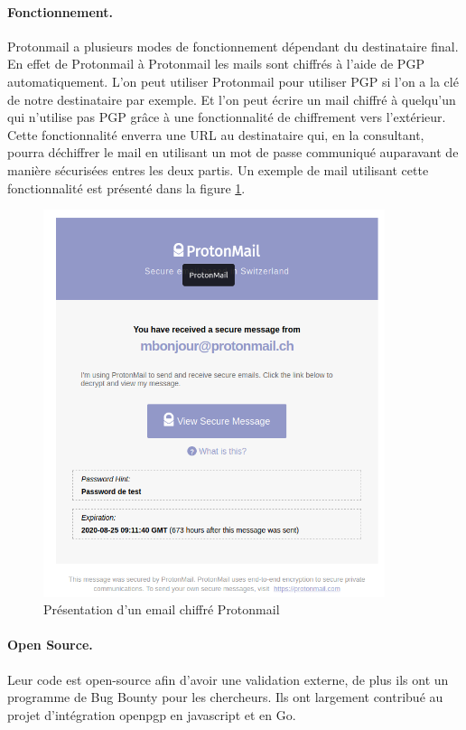 \paragraph*{Fonctionnement.}
Protonmail a plusieurs modes de fonctionnement dépendant du destinataire final. En effet de Protonmail à Protonmail les mails sont chiffrés à l'aide de PGP automatiquement. L'on peut utiliser Protonmail pour utiliser PGP si l'on a la clé de notre destinataire par exemple. Et l'on peut écrire un mail chiffré à quelqu'un qui n'utilise pas PGP grâce à une fonctionnalité de chiffrement vers l'extérieur.
Cette fonctionnalité enverra une URL au destinataire qui, en la consultant, pourra déchiffrer le mail en utilisant un mot de passe communiqué auparavant de manière sécurisées entres les deux partis. Un exemple de mail utilisant cette fonctionnalité est présenté dans la figure \ref{fig:ProtonmailPres}.
\begin{figure}[h!]
	\includegraphics[width=10cm]{images/protonmailPresentation.png}
	\centering
	\caption{Présentation d'un email chiffré Protonmail}
	\label{fig:ProtonmailPres}
\end{figure}
\paragraph*{Open Source.}
Leur code est open-source afin d'avoir une validation externe, de plus ils ont un programme de Bug Bounty pour les chercheurs. Ils ont largement contribué au projet d'intégration openpgp en javascript et en Go.

